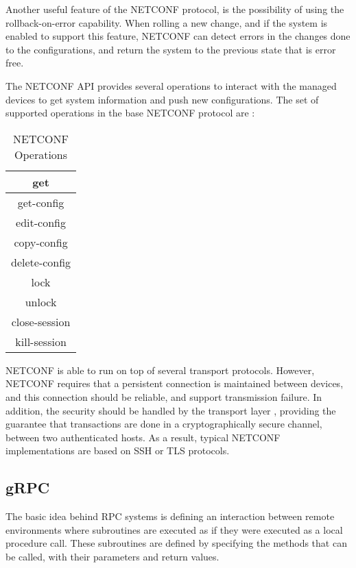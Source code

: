 \par Another useful feature of the NETCONF protocol, is the possibility of using the rollback-on-error capability. When rolling a new change,
and if the system is enabled to support this feature, NETCONF can detect errors in the changes done to the configurations, and return the system to the previous
state that is error free. 

\par The NETCONF API provides several operations to interact with the managed devices to get system information and push new configurations. The set of supported 
operations in the base NETCONF protocol are \cite{enns_network_2011}:

\begin{table}[H]
    \centering
    \caption{NETCONF Operations}
    \begin{tabular}{c}
       get  \\ \hline
       get-config  \\ \hline
       edit-config  \\ \hline
       copy-config  \\ \hline
       delete-config  \\ \hline
       lock  \\ \hline
       unlock  \\ \hline
       close-session  \\ \hline
       kill-session  
    \end{tabular}
\end{table}

\par NETCONF is able to run on top of several transport protocols. However, NETCONF requires that a persistent connection is maintained  between devices,
and this connection should be reliable, and support transmission failure. In addition, the security should be handled by the transport layer 
\cite{jurgen_schonwalder_network_2012}, providing the guarantee that transactions are done in a cryptographically secure channel, between two authenticated hosts. 
As a result, typical NETCONF implementations are based on SSH or TLS protocols.

\subsection{gRPC} \label{sec:grpc}

The basic idea behind RPC systems is defining an interaction between remote environments where subroutines are executed as if they were executed as a local
procedure call. These subroutines are defined by specifying the methods that can be called, with their parameters and return values.


